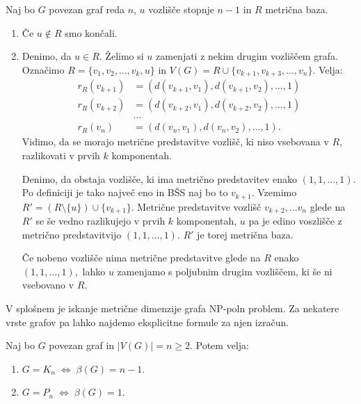 \documentclass[mat1, tisk]{fmfdelo}
\newcommand{\1}{(1, 1, \ldots, 1)}
\newcommand{\2}{(2, 2, \ldots, 2)}
\begin{document}
\begin{dokaz}
    Naj bo $G$ povezan graf reda $n$, $u$ vozlišče stopnje $n-1$ in $R$ metrična baza.
    \begin{enumerate}
        \item Če $u \notin R$ smo končali.
        \item Denimo, da $u \in R.$ Želimo si $u$ zamenjati z nekim drugim vozliščem grafa. 
         Označimo $R = \{v_1, v_2, \ldots, v_k, u\}$ in $V(G) = R \cup \{v_{k+1}, v_{k+3}, \ldots, v_n \}.$
         Velja:
         \begin{align*}
            r_R(v_{k+1}) & = (d(v_{k+1}, v_1), d(v_{k+1}, v_2), \ldots, 1) \\
            r_R(v_{k+2}) & = (d(v_{k+2}, v_1),  d(v_{k+2}, v_2), \ldots, 1) \\
            & \dots \\
            r_R(v_n)  & = (d(v_n, v_1), d(v_n, v_2), \ldots, 1).
        \end{align*}
        Vidimo, da se morajo metrične predstavitve vozlišč, ki niso vsebovana v $R$, razlikovati v prvih $k$
        komponentah. 
        
        Denimo, da obstaja vozlišče, ki ima metrično predstavitev enako $ \1.$ Po definiciji je tako največ eno in 
        BŠS naj bo to $v_{k+1}$.
        Vzemimo $R' = (R \setminus \{u\} ) \cup  \{v_{k+1}\}$.
        Metrične predstavitve vozlišč $v_{k+2}, \ldots v_n$ glede na $R'$ se še vedno razlikujejo v prvih $k$ komponentah,
        $u$ pa je edino voszlišče z metrično predstavitvijo $\1.$ $R'$ je torej metrična baza.

        Če nobeno vozlišče nima metrične predstavitve glede na $R$ enako $\1,$ lahko $u$ zamenjamo s poljubnim drugim
        vozliščem, ki še ni vsebovano v $R$. 
    \end{enumerate}
\end{dokaz}

    

V splošnem je iskanje metrične dimenzije grafa NP-poln problem. Za nekatere vrste grafov
pa lahko najdemo eksplicitne formule za njen izračun.

\begin{trditev} \label{trd:mdim_polni_pot}
    Naj bo $G$ povezan graf in $|V(G)| = n \geq 2.$ Potem velja:
    \begin{enumerate}
        \item $G = K_n \; \Leftrightarrow \; \beta(G) = n - 1.$
        \item $G = P_n \; \Leftrightarrow \; \beta(G) = 1.$
    \end{enumerate} 
\end{trditev}
\end{document}
